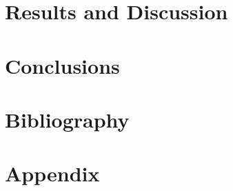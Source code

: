 \documentclass[10pt,twoside]{book}
\begin{document}

\clearpage

\chapter{Results and Discussion}
\clearpage

\clearpage

\chapter{Conclusions}
\clearpage


\chapter{Bibliography}
\clearpage
\begin{multicols}{2}
\printbibliography[heading=none]
\end{multicols}

\chapter{Appendix}
\clearpage

\clearpage
\end{document}
